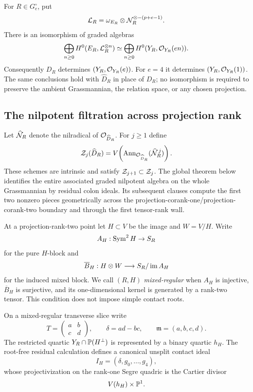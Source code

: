 \begin{theorem}
\label{thm:main-reconstruction}
For \(R\in G_e^\circ\), put
\[
 \mathcal L_R=
 \omega_{E_R}\otimes
 \mathcal N_R^{\otimes-(p+e-1)}.
\]
There is an isomorphism of graded algebras
\[
 \bigoplus_{n\ge0}H^0(E_R,\mathcal L_R^{\otimes n})
 \simeq
 \bigoplus_{n\ge0}H^0(Y_R,\mathcal O_{Y_R}(en)).
\]
Consequently \(D_R\) determines
\((Y_R,\mathcal O_{Y_R}(e))\).  For \(e=4\) it determines
\((Y_R,\mathcal O_{Y_R}(1))\).  The same conclusions hold with
\(\widehat D_R\) in place of \(D_R\); no isomorphism is required to
preserve the ambient Grassmannian, the relation space, or any chosen
projection.
\end{theorem}

\subsection*{The nilpotent filtration across projection rank}

Let \(\widehat{\mathcal N}_R\) denote the nilradical of
\(\mathcal O_{\widehat D_R}\).  For \(j\ge1\) define
\begin{equation}\label{eq:Zj-intro}
 \mathcal Z_j(\widehat D_R)
 =
 V\!\left(
 \operatorname{Ann}_{\mathcal O_{\widehat D_R}}
 (\widehat{\mathcal N}_R^{\,j})\right).
\end{equation}
These schemes are intrinsic and satisfy
\(\mathcal Z_{j+1}\subset\mathcal Z_j\).  The global theorem below identifies
the entire associated graded nilpotent algebra on the whole
Grassmannian by residual colon ideals.  Its subsequent clauses compute
the first two nonzero pieces geometrically across the
projection-corank-one/projection-corank-two boundary and through the
first tensor-rank wall.

At a projection-rank-two point let \(H\subset V\) be the image and
\(W=V/H\).  Write
\[
 A_H:\operatorname{Sym}^2H\to S_R
\]
for the pure \(H\)-block and
\[
 \overline B_H:H\otimes W\longrightarrow S_R/\operatorname{im} A_H
\]
for the induced mixed block.  We call \((R,H)\)
\emph{mixed-regular} when \(A_H\) is injective,
\(\overline B_H\) is surjective, and its one-dimensional kernel is
generated by a rank-two tensor.  This condition does not impose
simple contact roots.

On a mixed-regular transverse slice write
\[
 T=\begin{pmatrix}a&b\\c&d\end{pmatrix},\qquad
 \delta=ad-bc,\qquad
 \mathfrak m=(a,b,c,d).
\]
The restricted quartic \(Y_R\cap\mathbb P(H^\perp)\) is represented by a
binary quartic \(h_H\).  The root-free residual calculation defines a
canonical unsplit contact ideal
\[
 I_H=(\delta,g_0,\ldots,g_4),
\]
whose projectivization on the rank-one Segre quadric is the Cartier
divisor
\[
 V(h_H)\times\mathbb P^1.
\]


